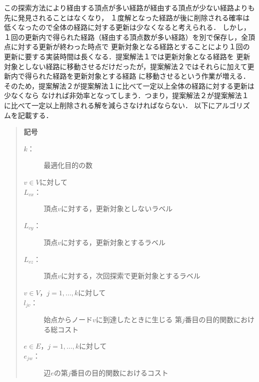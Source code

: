 \documentclass[12pt]{optlab-bachelor}
\begin{document}
この探索方法により経由する頂点が多い経路が経由する頂点が少ない経路よりも先に発見されることはなくなり，
１度解となった経路が後に削除される確率は低くなったので全体の経路に対する更新は少なくなると考えられる．
しかし，１回の更新内で得られた経路（経由する頂点数が多い経路）を別で保存し，全頂点に対する更新が終わった時点で
更新対象となる経路とすることにより１回の更新に要する実装時間は長くなる．提案解法１では更新対象となる経路を
更新対象としない経路に移動させるだけだったが，提案解法２ではそれらに加えて更新内で得られた経路を更新対象とする経路
に移動させるという作業が増える．そのため，提案解法２が提案解法１に比べて一定以上全体の経路に対する更新は少なくなら
なければ非効率となってしまう．つまり，提案解法２が提案解法１に比べて一定以上削除される解を減らさなければならない．
以下にアルゴリズムを記載する．

\begin{quote}
  \textbf{記号}
  \begin{description}
    \item[$k$：] 最適化目的の数
    \item[$v \in V$に対して]
    \item[$L_{vx}$：] 頂点$v$に対する，更新対象としないラベル
    \item[$L_{vy}$：] 頂点$v$に対する，更新対象とするラベル
    \item[$L_{vz}$：] 頂点$v$に対する，次回探索で更新対象とするラベル
    \item[$v \in V$，$j = 1 , \ldots , k$に対して]
    \item[$l_{jv}$：] 始点からノード$v$に到達したときに生じる
    第$j$番目の目的関数における総コスト
    \item[$e \in E$，$j = 1 , \ldots , k$に対して]
    \item[$e_{jw}$：] 辺$e$の第$j$番目の目的関数におけるコスト
  \end{description}
\end{quote}
\end{document}
